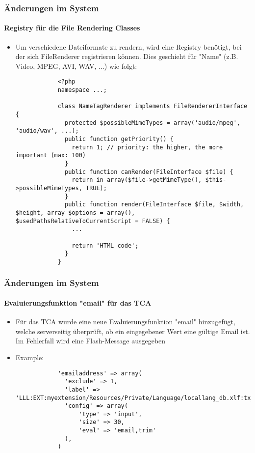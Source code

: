 \begin{frame}[fragile]
	\frametitle{Änderungen im System}
	\framesubtitle{Registry für die File Rendering Classes}

	\lstset{
		basicstyle=\tiny\ttfamily
	}

	\begin{itemize}
		\item Um verschiedene Dateiformate zu rendern, wird eine Registry benötigt,
			bei der sich FileRenderer registrieren können. Dies geschieht für "Name"
			(z.B. Video, MPEG, AVI, WAV, ...) wie folgt:

		\begin{lstlisting}
			<?php
			namespace ...;

			class NameTagRenderer implements FileRendererInterface {
			  protected $possibleMimeTypes = array('audio/mpeg', 'audio/wav', ...);
			  public function getPriority() {
			    return 1; // priority: the higher, the more important (max: 100)
			  }
			  public function canRender(FileInterface $file) {
			    return in_array($file->getMimeType(), $this->possibleMimeTypes, TRUE);
			  }
			  public function render(FileInterface $file, $width, $height, array $options = array(), $usedPathsRelativeToCurrentScript = FALSE) {
			    ...

			    return 'HTML code';
			  }
			}
		\end{lstlisting}

	\end{itemize}

\end{frame}


\begin{frame}[fragile]
	\frametitle{Änderungen im System}
	\framesubtitle{Evaluierungsfunktion "email" für das TCA}

	\begin{itemize}
		\item Für das TCA wurde eine neue Evaluierungsfunktion "email" hinzugefügt,
			welche serverseitig überprüft, ob ein eingegebener Wert eine gültige
			Email ist. Im Fehlerfall wird eine Flash-Message ausgegeben

		\item Example:

		\begin{lstlisting}
			'emailaddress' => array(
			  'exclude' => 1,
			  'label' => 'LLL:EXT:myextension/Resources/Private/Language/locallang_db.xlf:tx_myextension
		 	  'config' => array(
			      'type' => 'input',
			      'size' => 30,
			      'eval' => 'email,trim'
			  ),
			)
		\end{lstlisting}
	\end{itemize}

\end{frame}

